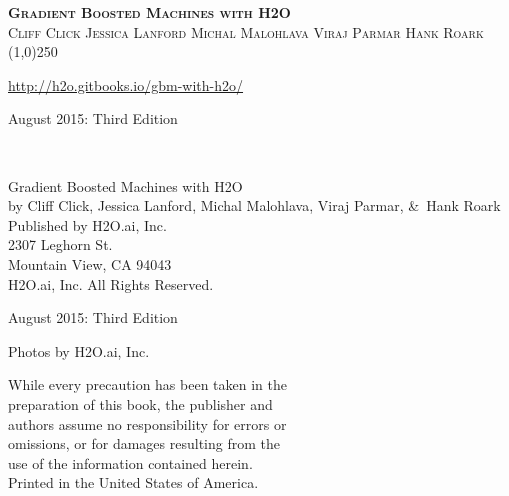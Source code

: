 








\thispagestyle{empty} %

\begin{center}
\textsc{\Large\bf{Gradient Boosted Machines with H2O}}
\\
\bigskip
\textsc{\small{Cliff Click \hspace{20pt} Jessica Lanford \hspace{20pt} Michal Malohlava \hspace{20pt} Viraj Parmar \hspace{20pt} Hank Roark }}
\\
\bigskip
\line(1,0){250}  %

{\url{http://h2o.gitbooks.io/gbm-with-h2o/}}

\bigskip
August 2015: Third Edition 
\\%
\bigskip
\end{center}

{\raggedright\vfill\ 

Gradient Boosted Machines with H2O\\
  by Cliff Click, Jessica Lanford, Michal Malohlava, Viraj Parmar, \&\  Hank Roark\\
\bigskip
  Published by H2O.ai, Inc. \\
2307 Leghorn St. \\
Mountain View, CA 94043\\
\bigskip
{} H2O.ai, Inc. All Rights Reserved. 
\bigskip

August 2015: Third Edition
\bigskip

Photos by \textcopyright H2O.ai, Inc.
\bigskip

While every precaution has been taken in the\\
preparation of this book, the publisher and\\
authors assume no responsibility for errors or\\
omissions, or for damages resulting from the\\
use of the information contained herein.\\
\bigskip
Printed in the United States of America. 
}

